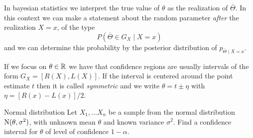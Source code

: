 \documentclass[12pt]{extarticle}
\newcommand{\Normal}{{\operatorfont N}}
\begin{document}
In bayesian statistics we interpret the true value of $\theta$ as the realization of $\bar \Theta$.
In this context we can make a statement about the random parameter \emph{after} the realization $X = x$, of the type
\begin{equation}
    P(\bar \Theta \in G_X \mid X = x)
\end{equation}
and we can determine this probability by the posterior distribution of $p_{\bar \Theta \mid X = x}$.

If we focus on $\theta \in \mathbb{R}$ we have that confidence regions are usually intervals of the form $G_X = [R(X), L(X)]$.
If the interval is centered around the point estimate $t$ then it is called \emph{symmetric} and we write $\theta = t \pm \eta$ with $\eta = [R(x) - L(x)]/2$.

\begin{example}{Normal distribution}{}
    Let $X_1, \dots X_n$ be a sample from the normal distribution $\Normal(\theta, \sigma^2)$, with unknown mean $\theta$ and known variance $\sigma^2$.
    Find a confidence interval for $\theta$ of level of confidence $1-\alpha$.
\end{example}
\end{document}
